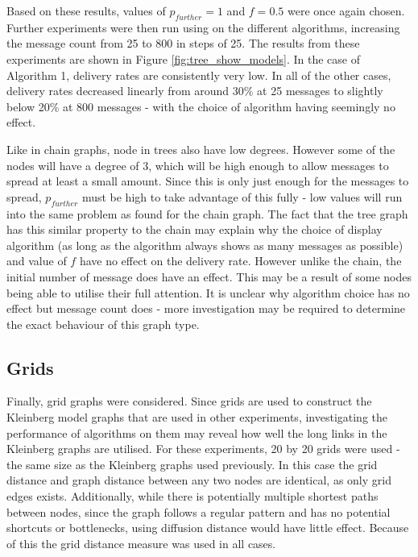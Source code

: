 \documentclass[bsc,frontabs,twoside,singlespacing,parskip,deptreport]{infthesis}     %
\begin{document}
Based on these results, values of $p_{further}=1$ and $f=0.5$ were once again chosen. Further experiments were then run using on the different algorithms, increasing the message count from 25 to 800 in steps of 25. The results from these experiments are shown in Figure \ref{fig:tree_show_models}. In the case of Algorithm 1, delivery rates are consistently very low. In all of the other cases, delivery rates decreased linearly from around 30\% at 25 messages to slightly below 20\% at 800 messages - with the choice of algorithm having seemingly no effect.

Like in chain graphs, node in trees also have low degrees. However some of the nodes will have a degree of 3, which will be high enough to allow messages to spread at least a small amount. Since this is only just enough for the messages to spread, $p_{further}$ must be high to take advantage of this fully - low values will run into the same problem as found for the chain graph. The fact that the tree graph has this similar property to the chain may explain why the choice of display algorithm (as long as the algorithm always shows as many messages as possible) and value of $f$ have no effect on the delivery rate. However unlike the chain, the initial number of message does have an effect. This may be a result of some nodes being able to utilise their full attention. It is unclear why algorithm choice has no effect but message count does - more investigation may be required to determine the exact behaviour of this graph type.


\subsection{Grids}
Finally, grid graphs were considered. Since grids are used to construct the Kleinberg model graphs that are used in other experiments, investigating the performance of algorithms on them may reveal how well the long links in the Kleinberg graphs are utilised. For these experiments, 20 by 20 grids were used - the same size as the Kleinberg graphs used previously. In this case the grid distance and graph distance between any two nodes are identical, as only grid edges exists. Additionally, while there is potentially multiple shortest paths between nodes, since the graph follows a regular pattern and has no potential shortcuts or bottlenecks, using diffusion distance would have little effect. Because of this the grid distance measure was used in all cases.
\end{document}
